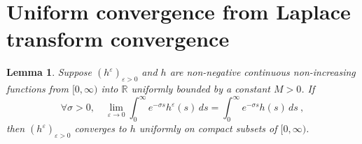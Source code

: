 \documentclass[reqno, 12pt, a4paper]{amsart}
\theoremstyle{plain}
\newtheorem{lemma}[theorem]{Lemma}
\theoremstyle{definition}
\begin{document}

\section{Uniform convergence from Laplace transform convergence}

\begin{lemma}
\label{lem:Tauber}
Suppose $(h^\varepsilon)_{\varepsilon>0}$ and $h$ are non-negative continuous non-increasing functions from $[0,\infty)$ into $\mathbb R$ uniformly bounded by a constant $M>0$. If
\[
\forall \sigma>0, \quad \lim_{\varepsilon \to 0} \int_0^\infty e^{-\sigma s} h^\varepsilon (s) \, ds = \int_0^\infty e^{-\sigma s} h (s) \, ds \ ,
\]
then $(h^\varepsilon)_{\varepsilon> 0}$ converges to $h$ uniformly on compact subsets of $[0,\infty)$.
\end{lemma}
\end{document}
